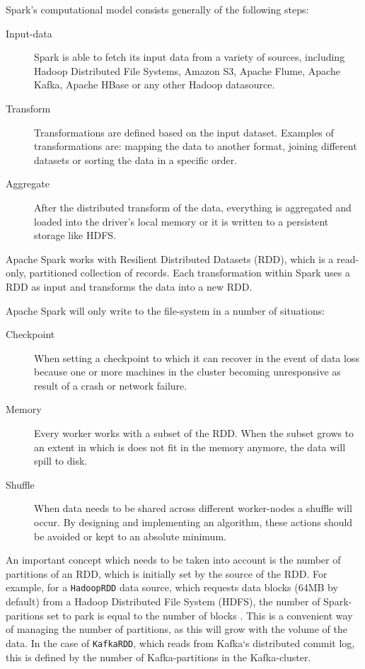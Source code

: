 Spark's computational model consists generally of the following steps:

\begin{description}
  \item[Input-data] Spark is able to fetch its input data from a variety of sources, including Hadoop Distributed File Systems, Amazon S3, Apache Flume, Apache Kafka, Apache HBase or any other Hadoop datasource.
  \item[Transform] Transformations are defined based on the input dataset. Examples of transformations are: mapping the data to another format, joining different datasets or sorting the data in a specific order.
  \item[Aggregate] After the distributed transform of the data, everything is aggregated and loaded into the driver's local memory or it is written to a persistent storage like HDFS.
\end{description}

Apache Spark works with Resilient Distributed Datasets (RDD), which is a read-only, partitioned collection of records. Each transformation within Spark uses a RDD as input and transforms the data into a new RDD. 

Apache Spark will only write to the file-system in a number of situations:
\begin{description}
    \item[Checkpoint] When setting a checkpoint to which it can recover in the event of data loss because one or more machines in the cluster becoming unresponsive as result of a crash or network failure.
    \item[Memory] Every worker works with a subset of the RDD. When the subset grows to an extent in which is does not fit in the memory anymore, the data will spill to disk.
    \item[Shuffle] When data needs to be shared across different worker-nodes a shuffle will occur. By designing and implementing an algorithm, these actions should be avoided or kept to an absolute minimum.
\end{description}

An important concept which needs to be taken into account is the number of partitions of an RDD, which is initially set by the source of the RDD. For example, for a \texttt{HadoopRDD} data source, which requests data blocks (64MB by default) from a Hadoop Distributed File System (HDFS), the number of Spark-paritions set to park is equal to the number of blocks \cite{Dean:2008:MSD:1327452.1327492}. This is a convenient way of managing the number of partitions, as this will grow with the volume of the data. In the case of \texttt{KafkaRDD}, which reads from Kafka`s distributed commit log, this is defined by the number of Kafka-partitions in the Kafka-cluster.

